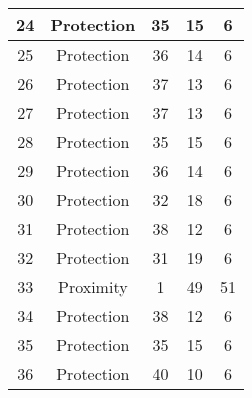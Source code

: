 \documentclass[results.tex]{subfiles}
\begin{document}
\begin{center}
\begin{tabular}{| c || c | c | c | c |}
            \hline
            24                      & Protection                   & 35                     & 15                      & 6                    \\
            \hline
            25                      & Protection                   & 36                     & 14                      & 6                    \\
            \hline
            26                      & Protection                   & 37                     & 13                      & 6                    \\
            \hline
            27                      & Protection                   & 37                     & 13                      & 6                    \\
            \hline
            28                      & Protection                   & 35                     & 15                      & 6                    \\
            \hline
            29                      & Protection                   & 36                     & 14                      & 6                    \\
            \hline
            30                      & Protection                   & 32                     & 18                      & 6                    \\
            \hline
            31                      & Protection                   & 38                     & 12                      & 6                    \\
            \hline
            32                      & Protection                   & 31                     & 19                      & 6                    \\
            \hline
            33                      & Proximity                    & 1                      & 49                      & 51                   \\
            \hline
            34                      & Protection                   & 38                     & 12                      & 6                    \\
            \hline
            35                      & Protection                   & 35                     & 15                      & 6                    \\
            \hline
            36                      & Protection                   & 40                     & 10                      & 6                    \\

\end{tabular}
\end{center}
\end{document}
